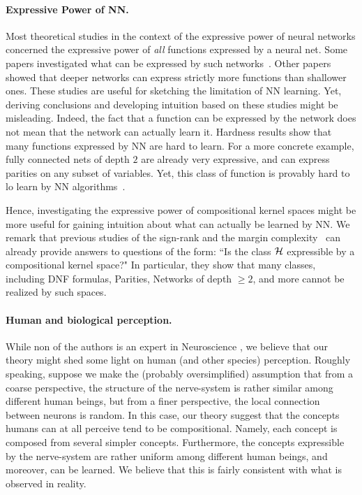 \paragraph{Expressive Power of NN.} Most theoretical studies in the context of the expressive power of neural networks concerned the expressive power of {\em all} functions expressed by a neural net. Some papers investigated what can be expressed by such networks~\cite{karp1980some, Barron93}. Other papers~\cite{rossman2015average, hastad1986almost, eldan2015power, cohen2015expressive} showed that deeper networks can express strictly more functions than shallower ones. These studies are useful for sketching the limitation of NN learning. Yet, deriving conclusions and developing intuition based on these studies might be misleading. Indeed, the fact that a function can be expressed by the network does not mean that the network can actually learn it. Hardness results show that many functions expressed by NN are hard to learn. For a more concrete example, fully connected nets of depth $2$ are already very expressive, and can express parities on any subset of variables. Yet, this class of function is provably hard to lo learn by NN algorithms~\cite{blum2003noise}.

Hence, investigating the expressive power of compositional kernel spaces might be more useful for gaining intuition about what can actually be learned by NN. We remark that previous studies of the sign-rank and the margin complexity~\cite{razborov2008sign, sherstov2007halfspace, linial2007complexity, klivans2001learning, ben2003limitations} can already provide answers to questions of the form: ``Is the class ${\cal H}$ expressible by a compositional kernel space?" In particular, they show that many classes, including DNF formulas, Parities, Networks of depth $\ge 2$, and more cannot be realized by such spaces.


\paragraph{Human and biological perception.} While non of the authors is an expert in Neuroscience , we believe that our theory might shed some light on human (and other species) perception. Roughly speaking, suppose we make the (probably oversimplified) assumption that from a coarse perspective, the structure of the nerve-system is rather similar among different human beings, but from a finer perspective, the local connection between neurons is random.
In this case, our theory suggest that the concepts humans can at all perceive tend to be compositional. Namely, each concept is composed from several simpler concepts. Furthermore, the concepts expressible by the nerve-system are rather uniform among different human beings, and moreover, can be learned. We believe that this is fairly consistent with what is observed in reality.

